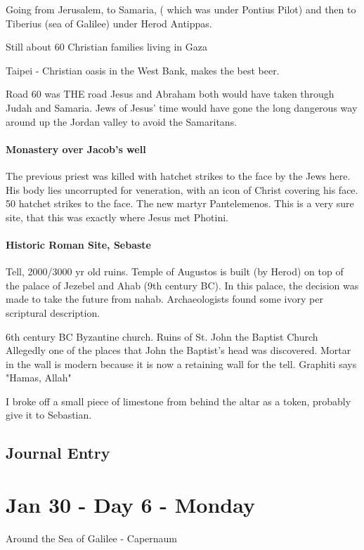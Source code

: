 \documentclass[letterpaper]{report}
\begin{document}
Going from Jerusalem, to Samaria, ( which was under Pontius Pilot) and then to Tiberius (sea of Galilee) under Herod Antippas.

Still about 60 Christian families living in Gaza

Taipei - Christian oasis in the West Bank, makes the best beer.

Road 60 was THE road Jesus and Abraham both would have taken through Judah and Samaria. Jews of Jesus' time would have gone the long dangerous way around up the Jordan valley to avoid the Samaritans.

\subsubsection{Monastery over Jacob's well}
The previous priest was killed with hatchet strikes to the face by the Jews here. His body lies uncorrupted for veneration, with an icon of Christ covering his face.
50 hatchet strikes to the face.
The new martyr Pantelemenos.
This is a very sure site, that this was exactly where Jesus met Photini.

\subsubsection{Historic Roman Site, Sebaste}
Tell, 2000/3000 yr old ruins. 
Temple of Augustos is built (by Herod) on top of the palace of Jezebel and Ahab (9th century BC). In this palace, the decision was made to take the future from nahab. Archaeologists found some ivory per scriptural description.

6th century BC Byzantine church.
Ruins of St. John the Baptist Church
Allegedly one of the places that John the Baptist's head was discovered. 
Mortar in the wall is modern because it is now a retaining wall for the tell.
Graphiti says "Hamas, Allah"

I broke off a small piece of limestone from behind the altar as a token,
probably give it to Sebastian.

\clearpage
\section{Journal Entry}


\clearpage
\chapter{Jan 30 - Day 6 - Monday}
Around the Sea of Galilee - Capernaum
\end{document}
